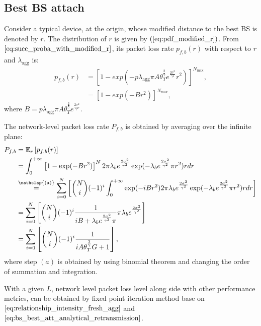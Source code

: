 \subsection{Best BS attach}
Consider a typical device, at the origin, whose modified distance to the best BS is denoted by $r$. The distribution of $r$ is given by $(\ref{eq:pdf_modified_r})$. From $\eqref{eq:succ_proba_with_modified_r}$, its packet loss rate $p_{f, b}(r)$ with respect to $r$ and $\lambda_{\text{agg}}$ is:
\begin{align}
	\label{eq: fail_proba_with_modified_r_retrans}
	p_{f, b}(r) &= \left[ 1 - exp(-p \lambda_{\text{agg}} \pi A \theta_{T}^{\frac{2}{\gamma}} e^{\frac{2\sigma^2}{\gamma^2}}  {r} ^ 2)\right] ^{N_{\text{max}}}, \nonumber \\
	&= \left[ 1 - exp(-B {r} ^ 2)\right] ^{N_{\text{max}}},
\end{align} 
where $B = p \lambda_{\text{agg}} \pi A \theta_{T}^{\frac{2}{\gamma}} e^{\frac{2\sigma^2}{\gamma^2}} $.

The network-level packet loss rate $P_{f,b}$ is obtained by averaging over the infinite plane:
\begin{align}
	\label{eq:bs_best_att_analytical_retransmission}
	P_{f,b} &= \mathbb{E}_{r}\left[ p_{f, b}(r) \right]  \nonumber\\
	&= \int_{0}^{+\infty}  \left[ 1- \exp(-B {r}^2 ) \right] ^{N} 2 \pi \lambda_b e^{\frac{2\sigma^2}{\gamma^2}}  \exp( -\lambda_b  e^{\frac{2\sigma^2}{\gamma^2}} \pi {r}^2 ) r dr \nonumber\\
	&\overset{\mathclap{\strut\text{(a)}}} =   \sum_{i=0}^{N}\left[ \binom{N}{i} (-1)^i \int_{0}^{+\infty}  \exp(-i B {r}^2) 2 \pi \lambda_b e^{\frac{2\sigma^2}{\gamma^2}}  \exp( -\lambda_b  e^{\frac{2\sigma^2}{\gamma^2}} \pi {r}^2 ) r dr \right]  \nonumber\\
	&=   \sum_{i=0}^{N}\left[ \binom{N}{i} (-1)^i \frac{1}{iB + \lambda_b  e^{\frac{2\sigma^2}{\gamma^2}} \pi }  \pi \lambda_b e^{\frac{2\sigma^2}{\gamma^2}} \right]  \nonumber\\	
	&=   \sum_{i=0}^{N}\left[ \binom{N}{i} (-1)^i \frac{1}{i A \theta_{T}^{\frac{2}{\gamma}} G + 1 } \right], 
\end{align}
where step $(a)$ is obtained by using binomial theorem and changing the order of summation and integration.

With a given $L$, network level packet loss level along side with other performance metrics, can be obtained by fixed point iteration method base on $\eqref{eq:relationship_intensity_fresh_agg}$ and $\eqref{eq:bs_best_att_analytical_retransmission}$.
